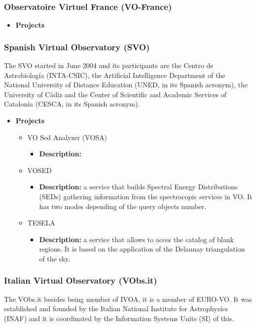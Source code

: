 \subsubsection{Observatoire Virtuel France (VO-France)}
\begin{itemize}
\item \textbf{Projects}
\end{itemize}

\subsubsection{Spanish Virtual Observatory (SVO)}
The SVO started in June 2004 and its participants are the Centro de
Astrobiolog\'{i}a (INTA-CSIC), the Artificial Intelligence Department of the
National University of Distance Education (UNED, in its Spanish acronym), the
University of C\'{a}diz and the Center of Scientific and Academic Services of
Catalonia (CESCA, in its Spanish acronym).

\begin{itemize}
\item \textbf{Projects}
\begin{itemize}
\item VO Sed Analyzer (VOSA)
\begin{itemize}
\item \textbf{Description:}  
\end{itemize}
\item VOSED
\begin{itemize}
\item \textbf{Description:} a service that builds Spectral Energy Distributions
(SEDs) gathering information from the spectrocopic services in VO. It has two
modes depending of the query objects number.
\end{itemize}
\item TESELA
\begin{itemize}
\item \textbf{Description:} a service that allows to acces the catalog of blank
regions. It is based on the application of the Delaunay triangulation of the
sky.
\end{itemize}
\end{itemize}
\end{itemize}

\subsubsection{Italian Virtual Observatory (VObs.it)}
The VObs.it besides being member of IVOA, it is a member of EURO-VO. It was
established and founded by the Italian National Institute for Astrophysics
(INAF) and it is coordinated by the Information Systems Units (SI) of this. 

